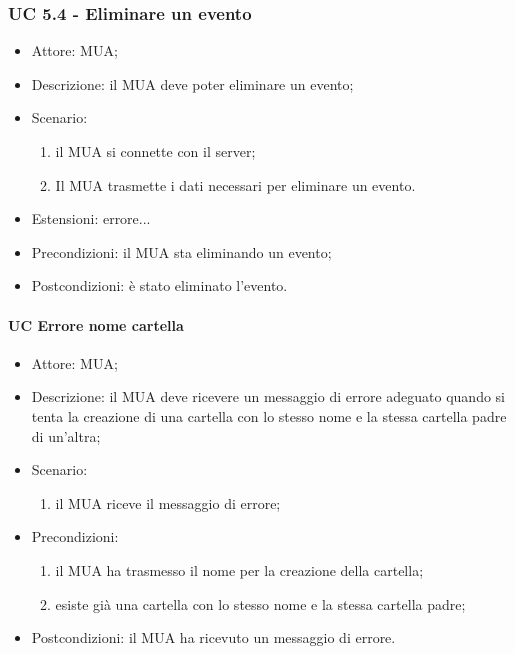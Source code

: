     \subsubsection{UC 5.4 - Eliminare un evento} \label{sec: UC 5.4}
    \begin{itemize}
        \item Attore: MUA;
        \item Descrizione: il MUA deve poter eliminare un evento;
        \item Scenario:
        \begin{enumerate}
        \item il MUA si connette con il server;
        \item Il MUA trasmette i dati necessari per eliminare un evento.
        \end{enumerate}
        \item Estensioni: errore...
        \item Precondizioni: il MUA sta eliminando un evento;
        \item Postcondizioni: è stato eliminato l'evento.
    \end{itemize}


    \paragraph{UC Errore nome cartella} \label{sec: UC 11.4.2.1}
    \begin{itemize}
        \item Attore: MUA;
        \item Descrizione: il MUA deve ricevere un messaggio di errore adeguato quando si tenta la creazione di una cartella con lo stesso nome e la stessa cartella padre di un'altra;
        \item Scenario:
        \begin{enumerate}
        \item il MUA riceve il messaggio di errore;
        \end{enumerate}   
        \item Precondizioni: 
        \begin{enumerate}
            \item il MUA ha trasmesso il nome per la creazione della cartella;
            \item esiste già una cartella con lo stesso nome e la stessa cartella padre;
        \end{enumerate}
        \item Postcondizioni: il MUA ha ricevuto un messaggio di errore.
    \end{itemize}

